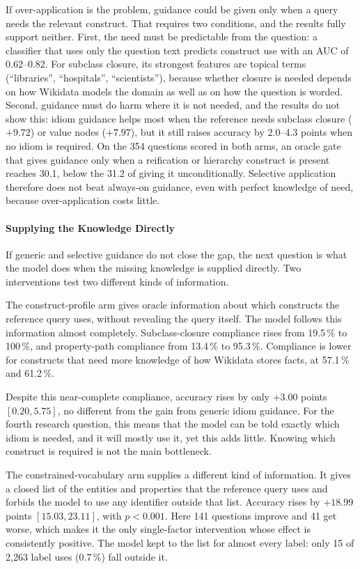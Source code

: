 If over-application is the problem, guidance could be given only when a query needs the relevant construct.
That requires two conditions, and the results fully support neither.
First, the need must be predictable from the question: a classifier that uses only the question text predicts construct use with an AUC of 0.62--0.82.
For subclass closure, its strongest features are topical terms (``libraries'', ``hospitals'', ``scientists''), because whether closure is needed depends on how Wikidata models the domain as well as on how the question is worded.
Second, guidance must do harm where it is not needed, and the results do not show this: idiom guidance helps most when the reference needs subclass closure ($+9.72$) or value nodes ($+7.97$), but it still raises accuracy by 2.0--4.3 points when no idiom is required.
On the 354 questions scored in both arms, an oracle gate that gives guidance only when a reification or hierarchy construct is present reaches 30.1, below the 31.2 of giving it unconditionally.
Selective application therefore does not beat always-on guidance, even with perfect knowledge of need, because over-application costs little.

\paragraph{Supplying the Knowledge
Directly}

If generic and selective guidance do not close the gap, the next question is what the model does when the missing knowledge is supplied directly.
Two interventions test two different kinds of information.

The construct-profile arm gives oracle information about which constructs the reference query uses, without revealing the query itself.
The model follows this information almost completely.
Subclass-closure compliance rises from 19.5\,\% to 100\,\%, and property-path compliance from 13.4\,\% to 95.3\,\%.
Compliance is lower for constructs that need more knowledge of how Wikidata stores facts, at 57.1\,\% and 61.2\,\%.

Despite this near-complete compliance, accuracy rises by only $+3.00$ points $[0.20, 5.75]$, no different from the gain from generic idiom guidance.
For the fourth research question, this means that the model can be told exactly which idiom is needed, and it will mostly use it, yet this adds little.
Knowing which construct is required is not the main bottleneck.

The constrained-vocabulary arm supplies a different kind of information.
It gives a closed list of the entities and properties that the reference query uses and forbids the model to use any identifier outside that list.
Accuracy rises by $+18.99$ points $[15.03, 23.11]$, with $p < 0.001$.
Here 141 questions improve and 41 get worse, which makes it the only single-factor intervention whose effect is consistently positive.
The model kept to the list for almost every label: only 15 of 2,263 label uses (0.7\,\%) fall outside it.


